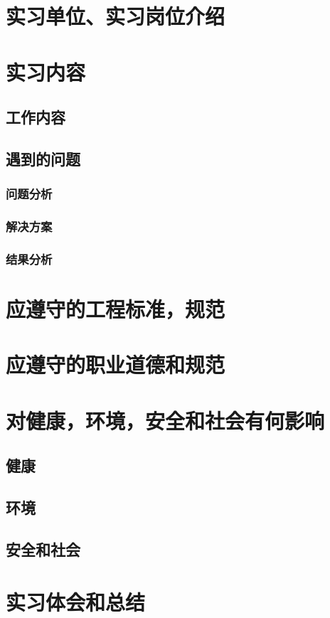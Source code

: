 \documentclass[10pt,a4paper]{article}
\begin{document}
\section{实习单位、实习岗位介绍}
\section{实习内容}
\subsection{工作内容}
\subsection{遇到的问题}
\subsubsection{问题分析}
\subsubsection{解决方案}
\subsubsection{结果分析}
\section{应遵守的工程标准，规范}
\section{应遵守的职业道德和规范}
\section{对健康，环境，安全和社会有何影响}
\subsection{健康}
\subsection{环境}
\subsection{安全和社会}
\section{实习体会和总结}
\end{document}
